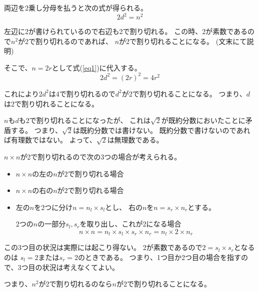 \documentclass[12pt,b5paper]{ltjsarticle}
\begin{document}
両辺を2乗し分母を払うと次の式が得られる。
\begin{equation}
 2d^2=n^2
  \label{eq1}
\end{equation}

左辺に2が書けられているので右辺も2で割り切れる。
この時、2が素数であるので$n^2$が2で割り切れるのであれば、
$n$が2で割り切れることになる。
(文末にて説明)

そこで、$n=2r$として式(\ref{eq1})に代入する。
\begin{equation}
 2d^2=(2r)^2=4r^2
\end{equation}

これにより$2d^2$は4で割り切れるので$d^2$が2で割り切れることになる。
つまり、$d$は2で割り切れることになる。

$n$も$d$も2で割り切れることになったが、
これは$\sqrt{2}$が既約分数においたことに矛盾する。
つまり、$\sqrt{2}$は既約分数では書けない。
既約分数で書けないのであれば有理数ではない。
よって、$\sqrt{2}$は無理数である。

\dotfill


$n\times n$が2で割り切れるので次の3つの場合が考えられる。
\begin{itemize}
 \item $n\times n$の左の$n$が$2$で割り切れる場合
 \item $n\times n$の右の$n$が$2$で割り切れる場合
 \item 左の$n$を2つに分け$n=n_l \times s_l$とし、
       右の$n$を$n=s_r \times n_r$とする。

       2つの$n$の一部分$s_l,s_r$を取り出し、これが2になる場合
      \begin{equation}
       n\times n = n_l \times s_l \times s_r \times n_r = n_l \times 2 \times n_r
      \end{equation}
\end{itemize}
この3つ目の状況は実際には起こり得ない。
2が素数であるので$2 = s_l \times s_r$となるのは
$s_l=2$または$s_r=2$のときである。
つまり、1つ目か2つ目の場合を指すので、3つ目の状況は考えなくてよい。

つまり、$n^2$が2で割り切れるのなら$n$が2で割り切れることになる。



\hrulefill
\end{document}
